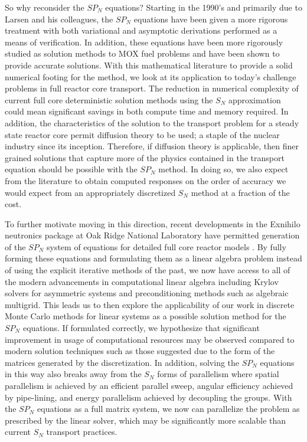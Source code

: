 So why reconsider the $SP_N$ equations? Starting in the 1990's and
primarily due to Larsen and his colleagues, the $SP_N$ equations have
been given a more rigorous treatment with both variational and
asymptotic derivations performed as a means of verification. In
addition, these equations have been more rigorously studied as
solution methods to MOX fuel problems and have been shown to provide
accurate solutions. With this mathematical literature to provide a
solid numerical footing for the method, we look at its application to
today's challenge problems in full reactor core transport. The
reduction in numerical complexity of current full core deterministic
solution methods using the $S_N$ approximation could mean significant
savings in both compute time and memory required. In addition, the
characteristics of the solution to the transport problem for a steady
state reactor core permit diffusion theory to be used; a staple of the
nuclear industry since its inception. Therefore, if diffusion theory
is applicable, then finer grained solutions that capture more of the
physics contained in the transport equation should be possible with
the $SP_N$ method. In doing so, we also expect from the literature to
obtain computed responses on the order of accuracy we would expect
from an appropriately discretized $S_N$ method at a fraction of the
cost. 

To further motivate moving in this direction, recent developments in
the Exnihilo neutronics package at Oak Ridge National Laboratory have
permitted generation of the $SP_N$ system of equations for detailed
full core reactor models \citep{evans_simpli_2013}. By fully forming
these equations and formulating them as a linear algebra problem
instead of using the explicit iterative methods of the past, we now
have access to all of the modern advancements in computational linear
algebra including Krylov solvers for asymmetric systems and
preconditioning methods such as algebraic multigrid. This leads us to
then explore the applicability of our work in discrete Monte Carlo
methods for linear systems as a possible solution method for the
$SP_N$ equations. If formulated correctly, we hypothesize that
significant improvement in usage of computational resources may be
observed compared to modern solution techniques such as those
suggested due to the form of the matrices generated by the
discretization. In addition, solving the $SP_N$ equations in this way
also breaks away from the $S_N$ forms of parallelism where spatial
parallelism is achieved by an efficient parallel sweep, angular
efficiency achieved by pipe-lining, and energy parallelism achieved by
decoupling the groups. With the $SP_N$ equations as a full matrix
system, we now can parallelize the problem as prescribed by the linear
solver, which may be significantly more scalable than current $S_N$
transport practices.

